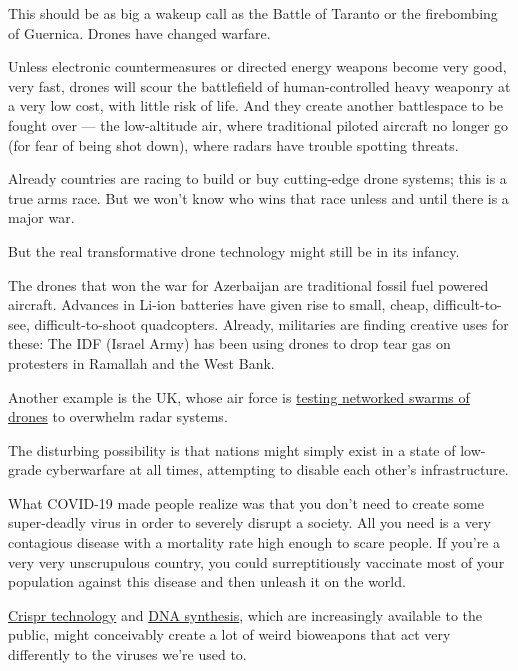 \documentclass[
]{book}
\begin{document}
This should be as big a wakeup call as the Battle of Taranto or the firebombing of Guernica. Drones have changed warfare.

Unless electronic countermeasures or directed energy weapons become very good, very fast, drones will scour the battlefield of human-controlled heavy weaponry at a very low cost, with little risk of life. And they create another battlespace to be fought over --- the low-altitude air, where traditional piloted aircraft no longer go (for fear of being shot down), where radars have trouble spotting threats.

Already countries are racing to build or buy cutting-edge drone systems; this is a true arms race. But we won't know who wins that race unless and until there is a major war.

But the real transformative drone technology might still be in its infancy.

The drones that won the war for Azerbaijan are traditional fossil fuel powered aircraft. Advances in Li-ion batteries have given rise to small, cheap, difficult-to-see, difficult-to-shoot quadcopters. Already, militaries are finding creative uses for these: The IDF (Israel Army) has been using drones to drop tear gas on protesters in Ramallah and the West Bank.

Another example is the UK, whose air force is \href{https://www.thedrive.com/the-war-zone/36950/raf-tests-swarm-loaded-with-britecloud-electronic-warfare-decoys-to-overwhelm-air-defenses}{testing networked swarms of drones} to overwhelm radar systems.

The disturbing possibility is that nations might simply exist in a state of low-grade cyberwarfare at all times, attempting to disable each other's infrastructure.

What COVID-19 made people realize was that you don't need to create some super-deadly virus in order to severely disrupt a society. All you need is a very contagious disease with a mortality rate high enough to scare people. If you're a very very unscrupulous country, you could surreptitiously vaccinate most of your population against this disease and then unleash it on the world.

\href{https://www.americansecurityproject.org/crispr-is-making-bioweapons-more-accessible/}{Crispr technology} and \href{https://cen.acs.org/biological-chemistry/synthetic-biology/Synthetic-biology-enable-bioweapons-development/96/i26}{DNA synthesis}, which are increasingly available to the public, might conceivably create a lot of weird bioweapons that act very differently to the viruses we're used to.
\end{document}
